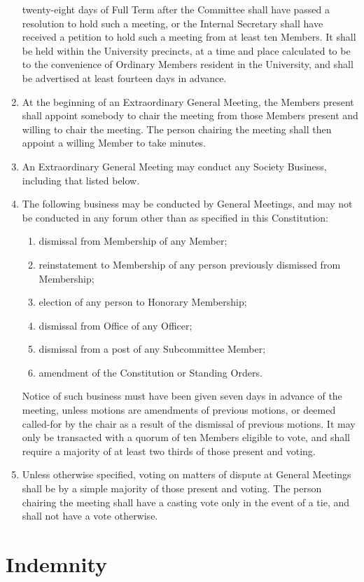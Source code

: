 \documentclass{article}
\begin{document}
\begin{enumerate}
twenty-eight days of Full Term after the Committee shall have passed a
resolution to hold such a meeting, or the Internal Secretary shall have received a
petition to hold such a meeting from at least ten Members.
It shall be held within the University precincts, at a time and place calculated to be to the convenience of Ordinary Members resident in the
University, and shall be advertised at least fourteen days in advance.
\item At the beginning of an Extraordinary General Meeting, the Members
present shall appoint somebody to chair the meeting from those Members present and willing to chair the meeting. The person chairing the
meeting shall then appoint a willing Member to take minutes.
\item An Extraordinary General Meeting may conduct any Society Business,
including that listed below.
\item The following business may be conducted by General Meetings, and may
not be conducted in any forum other than as specified in this Constitution:
  \begin{enumerate}
  \item dismissal from Membership of any Member;
  \item reinstatement to Membership of any person previously dismissed
  from Membership;
  \item election of any person to Honorary Membership;
  \item dismissal from Office of any Officer;
  \item dismissal from a post of any Subcommittee Member;
  \item amendment of the Constitution or Standing Orders.
  \end{enumerate}
Notice of such business must have been given seven days in advance of the
meeting, unless motions are amendments of previous motions, or deemed
called-for by the chair as a result of the dismissal of previous motions. It
may only be transacted with a quorum of ten Members eligible to vote, and shall require
a majority of at least two thirds of those present and voting.
\item Unless otherwise specified, voting on matters of dispute at General Meetings shall be by a simple majority of those present and voting. The person
chairing the meeting shall have a casting vote only in the event of a tie,
and shall not have a vote otherwise.
\end{enumerate}


\section{Indemnity}
\end{document}
